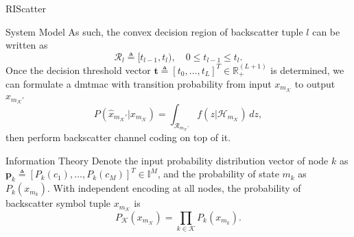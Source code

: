 \documentclass[journal]{IEEEtran}
\begin{document}
\begin{section}{RIScatter}
\begin{subsection}{System Model}
		As such, the convex decision region of backscatter tuple $l$ can be written as
		\begin{equation}
			\mathcal{R}_{l} \triangleq [t_{l-1},t_l), \quad 0 \le t_{l-1} \le t_l.
		\end{equation}
		Once the decision threshold vector $\boldsymbol{t} \triangleq [t_0,\ldots,t_L]^T \in \mathbb{R}_+^{(L+1)}$ is determined, we can formulate a \gls{dmtmac} with transition probability from input $x_{m_{\mathcal{K}}}$ to output $\hat{x}_{m_{\mathcal{K}}'}$
		\begin{equation}
			P(\hat{x}_{m_{\mathcal{K}}'}|x_{m_{\mathcal{K}}}) = \int_{\mathcal{R}_{m_{\mathcal{K}}'}} f(z|\mathcal{H}_{m_{\mathcal{K}}}) \, d z,
			\label{eq:dmtmac}
		\end{equation}
		then perform backscatter channel coding on top of it.
		\label{se:system_model}
	\end{subsection}

	\begin{subsection}{Information Theory}
		Denote the input probability distribution vector of node $k$ as $\boldsymbol{p}_k \triangleq [P_k(c_1),\ldots,P_k(c_M)]^T \in \mathbb{I}^{M}$, and the probability of state $m_k$ as $P_k(x_{m_k})$.
		With independent encoding at all nodes, the probability of backscatter symbol tuple $x_{m_{\mathcal{K}}}$ is
		\begin{equation}
			P_{\mathcal{K}}(x_{m_{\mathcal{K}}}) = \prod_{k \in \mathcal{K}} P_k(x_{m_k}).
			\label{eq:equivalent_distribution}
		\end{equation}


\end{subsection}
\end{section}
\end{document}
